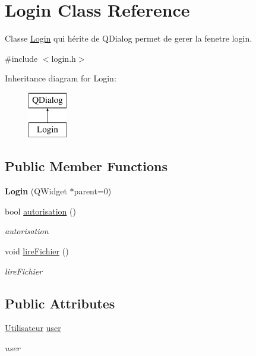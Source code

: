 \hypertarget{class_login}{}\section{Login Class Reference}
\label{class_login}


Classe \mbox{\hyperlink{class_login}{Login}} qui hérite de Q\+Dialog permet de gerer la fenetre login.  




{\ttfamily \#include $<$login.\+h$>$}

Inheritance diagram for Login\+:\begin{figure}[H]
\begin{center}
\leavevmode
\includegraphics[height=2.000000cm]{class_login}
\end{center}
\end{figure}
\subsection*{Public Member Functions}
\begin{DoxyCompactItemize}
\item 
\mbox{\label{class_login_a021ebcfd29b2a30e3f5c5bbb36589381}} 
{\bfseries Login} (Q\+Widget $\ast$parent=0)
\item 
bool \mbox{\hyperlink{class_login_ab6e2f801e7106b79425ae7c84bc8cd09}{autorisation}} ()
\begin{DoxyCompactList}\small\item\em autorisation \end{DoxyCompactList}\item 
\mbox{\label{class_login_a6e5865295833745434c41e363fef3861}} 
void \mbox{\hyperlink{class_login_a6e5865295833745434c41e363fef3861}{lire\+Fichier}} ()
\begin{DoxyCompactList}\small\item\em lire\+Fichier \end{DoxyCompactList}\end{DoxyCompactItemize}
\subsection*{Public Attributes}
\begin{DoxyCompactItemize}
\item 
\mbox{\label{class_login_af691b5ea63279c19dc46d172ddd302a6}} 
\mbox{\hyperlink{class_utilisateur}{Utilisateur}} \mbox{\hyperlink{class_login_af691b5ea63279c19dc46d172ddd302a6}{user}}
\begin{DoxyCompactList}\small\item\em user \end{DoxyCompactList}\end{DoxyCompactItemize}
